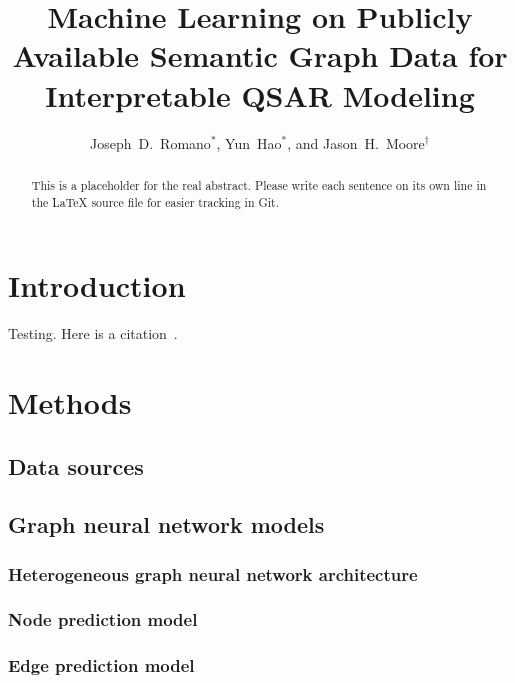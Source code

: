 \documentclass{ws-procs11x85}
\begin{document}
\title{Machine Learning on Publicly Available Semantic Graph Data for Interpretable QSAR Modeling}

\author{Joseph~D.~Romano$^*$, Yun~Hao$^*$, and Jason~H.~Moore$^\dag$}

\address{Institute for Biomedical Informatics, University of Pennsylvania,\\
Philadelphia, Pennsylvania 19104, United States\\
$^\dag$E-mail: jhmoore@upenn.edu\\
$^*$These authors contributed equally.}

\begin{abstract}
This is a placeholder for the real abstract.
Please write each sentence on its own line in the \LaTeX{} source file for easier tracking in Git.
\end{abstract}


\section{Introduction}\label{aba:sec1}
Testing.
Here is a citation~\cite{cherkasov2014qsar}.

\section{Methods}

\subsection{Data sources}

\subsection{Graph neural network models}

\subsubsection{Heterogeneous graph neural network architecture}

\subsubsection{Node prediction model}

\subsubsection{Edge prediction model}
\end{document}
